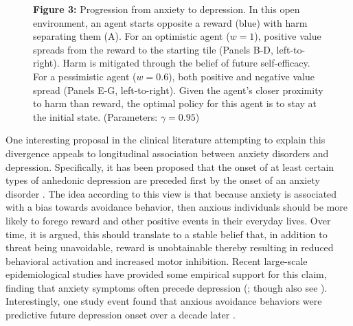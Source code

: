 \documentclass[11pt]{article} %
\begin{document}
\begin{figure}
  \centerline{%
  }
  \par \textbf{Figure 3:} Progression from anxiety to depression. In this open environment, an agent starts opposite a reward (blue) with harm separating them (A). For an optimistic agent ($w=1$), positive value spreads from the reward to the starting tile (Panels B-D, left-to-right). Harm is mitigated through the belief of future self-efficacy. For a pessimistic agent ($w=0.6$), both positive and negative value spread (Panels E-G, left-to-right). Given the agent's closer proximity to harm than reward, the optimal policy for this agent is to stay at the initial state. (Parameters: $\gamma = 0.95$)
\end{figure}

One interesting proposal in the clinical literature attempting to explain this divergence appeals to longitudinal association between anxiety disorders and depression. Specifically, it has been proposed that the onset of at least certain types of anhedonic depression are preceded first by the onset of an anxiety disorder \citep{alloy1990, moitra2008, jacobson2014}. The idea according to this view is that because anxiety is associated with a bias towards avoidance behavior, then anxious individuals should be more likely to forego reward and other positive events in their everyday lives. Over time, it is argued, this should translate to a stable belief that, in addition to threat being unavoidable, reward is unobtainable thereby resulting in reduced behavioral activation and increased motor inhibition. Recent large-scale epidemiological studies have provided some empirical support for this claim, finding that anxiety symptoms often precede depression (\cite{mathew2011, jacobson2014, kessler2015}; though also see \cite{jacobson2017, plana2019}). Interestingly, one study event found that anxious avoidance behaviors were predictive future depression onset over a decade later \citep{jacobson2014}.
\end{document}
